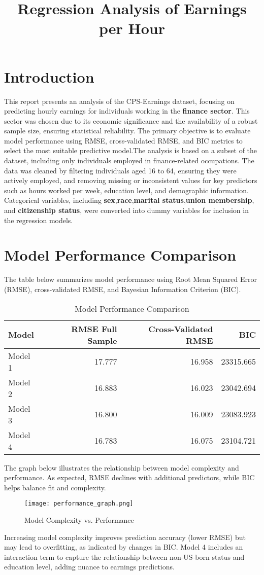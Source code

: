 \documentclass{article}
\title{Regression Analysis of Earnings per Hour}
\begin{document}
\maketitle
\section{Introduction}
This report presents an analysis of the CPS-Earnings dataset, focusing on predicting hourly earnings for individuals working in the 	\textbf{finance sector}. This sector was chosen due to its economic significance and the availability of a robust sample size, ensuring statistical reliability. The primary objective is to evaluate model performance using RMSE, cross-validated RMSE, and BIC metrics to select the most suitable predictive model.The analysis is based on a subset of the dataset, including only individuals employed in finance-related occupations. The data was cleaned by filtering individuals aged 16 to 64, ensuring they were actively employed, and removing missing or inconsistent values for key predictors such as hours worked per week, education level, and demographic information. Categorical variables, including \textbf{sex},\textbf{race},\textbf{marital status},\textbf{union membership}, and \textbf{citizenship status}, were converted into dummy variables for inclusion in the regression models.
\section{Model Performance Comparison}
The table below summarizes model performance using Root Mean Squared Error (RMSE), cross-validated RMSE, and Bayesian Information Criterion (BIC).

\begin{table}[H]
    \centering
    \begin{tabular}{lrrr}
    \toprule
      Model &  RMSE Full Sample &  Cross-Validated RMSE &       BIC \\
    \midrule
    Model 1 &            17.777 &                16.958 & 23315.665 \\
    Model 2 &            16.883 &                16.023 & 23042.694 \\
    Model 3 &            16.800 &                16.009 & 23083.923 \\
    Model 4 &            16.783 &                16.075 & 23104.721 \\
    \bottomrule
    \end{tabular}
    \caption{Model Performance Comparison}
\end{table}
The graph below illustrates the relationship between model complexity and performance. As expected, RMSE declines with additional predictors, while BIC helps balance fit and complexity.
\begin{figure}[H]
    \centering
    \texttt{[image: performance\_graph.png]}
    \caption{Model Complexity vs. Performance}
\end{figure}
Increasing model complexity improves prediction accuracy (lower RMSE) but may lead to overfitting, as indicated by changes in BIC. Model 4 includes an interaction term to capture the relationship between non-US-born status and education level, adding nuance to earnings predictions.
\end{document}

